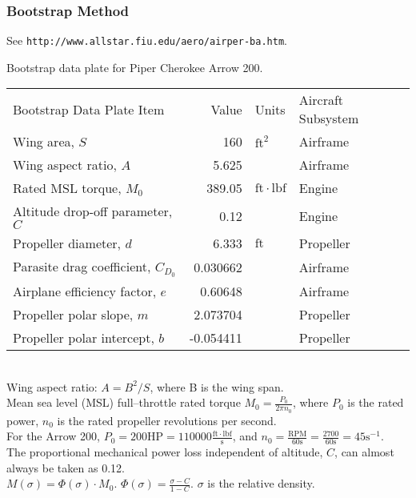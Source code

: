 \documentclass[a4paper,10pt,pdftex]{article}
\begin{document}
\subsubsection{Bootstrap Method}

See {\tt http://www.allstar.fiu.edu/aero/airper-ba.htm}.

Bootstrap data plate for Piper Cherokee Arrow 200.

\noindent\begin{tabular}{lrll}
  Bootstrap Data Plate Item & Value & Units & Aircraft Subsystem \\
  Wing area, $S$ & 160 & $\mathrm{ft}^2$ & Airframe \\
  Wing aspect ratio, $A$ & 5.625 & & Airframe \\
  Rated MSL torque, $M_0$ & 389.05 & $\mathrm{ft}\cdot\mathrm{lbf}$ & Engine \\
  Altitude drop-off parameter, $C$ & 0.12 & & Engine \\
  Propeller diameter, $d$ & 6.333 & $\mathrm{ft}$ & Propeller \\
  Parasite drag coefficient, $C_{D_0}$ & 0.030662 & & Airframe \\
  Airplane efficiency factor, $e$ & 0.60648 & & Airframe \\
  Propeller polar slope, $m$ & 2.073704 & & Propeller \\
  Propeller polar intercept, $b$ & -0.054411 & & Propeller \\
\end{tabular} \\

Wing aspect ratio: $A = B^2/S$, where B is the wing span. \\

Mean sea level (MSL) full--throttle rated torque $M_0 = \frac{P_0}{2\pi{}n_0}$,
where $P_0$ is the rated power, $n_0$ is the rated propeller revolutions per second. \\

For the Arrow 200, $P_0 = 200\mathrm{HP} = 110000\frac{\mathrm{ft}\cdot\mathrm{lbf}}{\mathrm{s}}$,
and $n_0 = \frac{\mathrm{RPM}}{60\mathrm{s}} = \frac{2700}{60\mathrm{s}} = 45\mathrm{s}^{-1}$. \\

The proportional mechanical power loss independent of altitude, $C$, can almost always be 
taken as 0.12. \\

$M(\sigma) = \Phi(\sigma)\cdot{}M_0$. $\Phi(\sigma) = \frac{\sigma - C}{1 - C}$. $\sigma$ is the
relative density. \\
\end{document}
